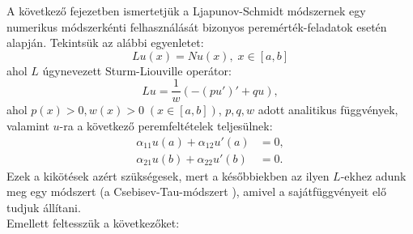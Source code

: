 \documentclass[oneside, titlepage, 12pt, a4paper]{report}
\begin{document}
A következő fejezetben ismertetjük a Ljapunov-Schmidt módszernek egy numerikus módszerkénti felhasználását bizonyos peremérték-feladatok esetén \cite{LSNum} alapján. %
Tekintsük az alábbi egyenletet:
\begin{equation}
Lu(x) = Nu(x),\;x\in[a, b] \label{eq:num:1}
\end{equation}
ahol $L$ úgynevezett Sturm-Liouville operátor:
\begin{equation*}
L u = \frac{1}{w} ( -(p u')' + q u),
\end{equation*}
ahol $p(x) > 0, w(x) > 0\;(x \in [a, b])$, $p, q, w$ adott analitikus függvények, valamint $u$-ra a következő peremfeltételek teljesülnek:
\begin{align*}
\alpha_{11}u(a) + \alpha_{12}u'(a) &= 0, \\
\alpha_{21}u(b) + \alpha_{22}u'(b) &= 0.
\end{align*}
Ezek a kikötések azért szükségesek, mert a későbbiekben az ilyen $L$-ekhez adunk meg egy módszert (a Csebisev-Tau-módszert \cite{ChebysevTau}), amivel a sajátfüggvényeit elő tudjuk állítani. \\ %
Emellett feltesszük a következőket:
\end{document}
